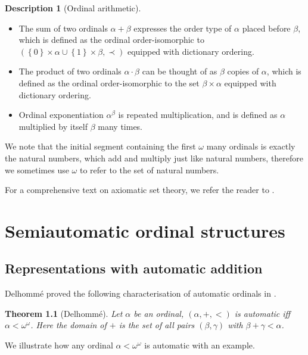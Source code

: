\documentclass[british,a4paper,11pt,abstract=on]{scrreprt}
\newtheorem{theorem}{Theorem}
\theoremstyle{definition}
\newtheorem{descr}[theorem]{Description}
\theoremstyle{remark}
\newcommand{\set}[1]{\left\{ #1 \right\}}
\begin{document}
\begin{descr}[Ordinal arithmetic]
    \hfill
    \begin{itemize}
        \item
            The sum of two ordinals \(\alpha + \beta\) expresses the order type of \(\alpha\) placed before \(\beta\),
            which is defined as the ordinal order-isomorphic to \((\set{0}\times \alpha \cup \set{1}\times \beta, \prec)\) equipped with dictionary ordering.
        \item
            The product of two ordinals \(\alpha\cdot \beta\) can be thought of as \(\beta\) copies of \(\alpha\),
            which is defined as the ordinal order-isomorphic to the set \(\beta\times \alpha\) equipped with dictionary ordering.
        \item
            Ordinal exponentiation \(\alpha^\beta\) is repeated multiplication,
            and is defined as \(\alpha\) multiplied by itself \(\beta\) many times.
    \end{itemize}
\end{descr}

We note that the initial segment containing the first \(\omega\) many ordinals is exactly the natural numbers, which add and multiply just like natural numbers, therefore we sometimes use \(\omega\) to refer to the set of natural numbers.

For a comprehensive text on axiomatic set theory, we refer the reader to \autocite{kunen}.

\chapter{Semiautomatic ordinal structures}

\section{Representations with automatic addition}

Delhomm\'e proved the following characterisation of automatic ordinals in \autocite{delhomme}.

\begin{theorem}[Delhomm\'e] \label{delhomme}
    Let \(\alpha\) be an ordinal, \((\alpha, +, <)\) is automatic iff \(\alpha < \omega^\omega\).
    Here the domain of \(+\) is the set of all pairs \((\beta,\gamma)\) with \(\beta + \gamma < \alpha\).
\end{theorem}

We illustrate how any ordinal \(\alpha < \omega^\omega\) is automatic with an example.
\end{document}
